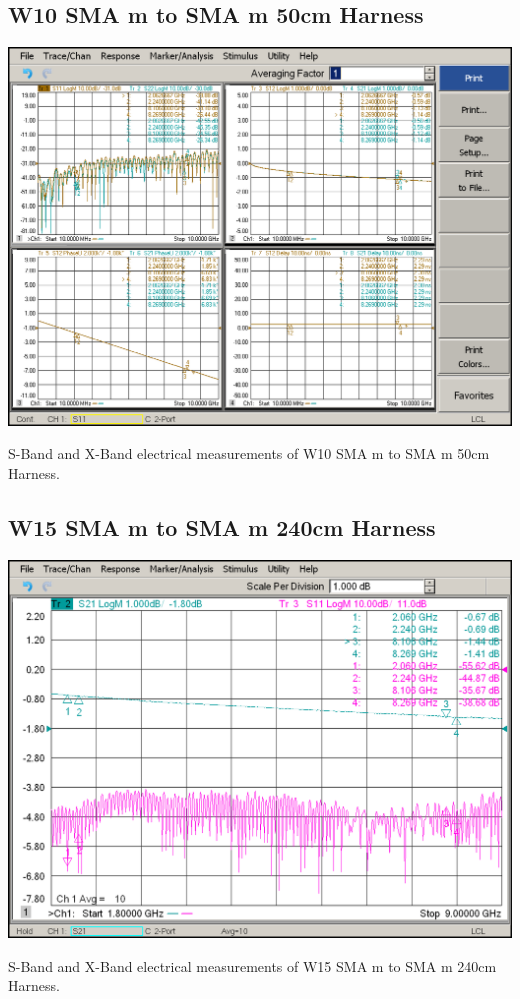 

\subsection{W10 SMA m to SMA m 50cm Harness}

\begin{table}[H]
	\centering
	\includegraphics[width=0.8\linewidth]{figuras/measures/W10_10M_10G}
	\caption{S-Band and X-Band electrical measurements of W10 SMA m to SMA m 50cm Harness.}
	\label{fig:W10}
\end{table}

\subsection{W15 SMA m to SMA m 240cm Harness}

\begin{table}[H]
	\centering
	\includegraphics[width=0.8\linewidth]{figuras/measures/W15-MFR64639227197-004.png}
	\caption{S-Band and X-Band electrical measurements of W15 SMA m to SMA m 240cm Harness.}
	\label{fig:W15}
\end{table}

